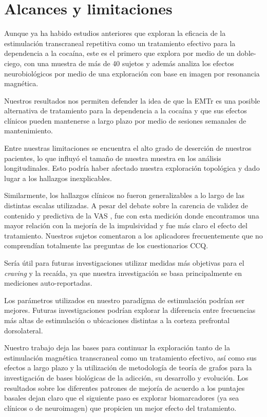 \section{Alcances y limitaciones}
Aunque ya ha habido estudios anteriores que exploran la eficacia de la estimulación transcraneal repetitiva como un tratamiento efectivo para la dependencia a la cocaína, este es el primero que explora por medio de un doble-ciego, con una muestra de más de 40 sujetos y además analiza los efectos neurobiológicos por medio de una exploración con base en imagen por resonancia magnética. \par
Nuestros resultados nos permiten defender la idea de que la EMTr es una posible alternativa de tratamiento para la dependencia a la cocaína y que sus efectos clínicos pueden mantenerse a largo plazo por medio de sesiones semanales de mantenimiento. \par
Entre nuestras limitaciones se encuentra el alto grado de deserción de nuestros pacientes, lo que influyó el tamaño de nuestra muestra en los análisis longitudinales. Esto podría haber afectado nuestra exploración topológica y dado lugar a los hallazgos inexplicables. \par
Similarmente, los hallazgos clínicos no fueron generalizables a lo largo de las distintas escalas utilizadas. A pesar del debate sobre la carencia de validez de contenido y predictiva de la VAS \parencite{Ekhtiari2019}, fue con esta medición donde encontramos una mayor relación con la mejoría de la impulsividad y fue más claro el efecto del tratamiento. Nuestros sujetos comentaron a los aplicadores frecuentemente que no comprendían totalmente las preguntas de los cuestionarios CCQ. \par
Sería útil para futuras investigaciones utilizar medidas más objetivas para el \textit{craving} y la recaída, ya que nuestra investigación se basa principalmente en mediciones auto-reportadas. \par
Los parámetros utilizados en nuestro paradígma de estimulación podrían ser mejores. Futuras investigaciones podrían explorar la diferencia entre frecuencias más altas de estimulación o ubicaciones distintas a la corteza prefrontal dorsolateral.\par
Nuestro trabajo deja las bases para continuar la exploración tanto de la estimulación magnética transcraneal como un tratamiento efectivo, así como sus efectos a largo plazo y la utilización de metodología de teoría de grafos para la investigación de bases biológicas de la adicción, su desarrollo y evolución. Los resultados sobre los diferentes patrones de mejoría de acuerdo a los puntajes basales dejan claro que el siguiente paso es explorar biomarcadores (ya sea clínicos o de neuroimagen) que propicien un mejor efecto del tratamiento.
